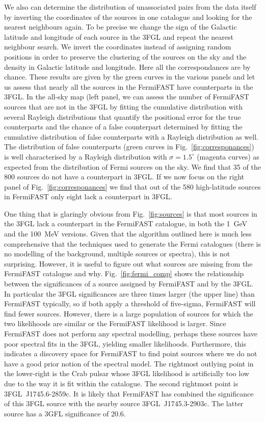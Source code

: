 \documentclass[useAMS,usenatbib]{mn2e}
\begin{document}
We also can determine the distribution of unassociated pairs from the
data itself by inverting the coordinates of the sources in one
catalogue and looking for the nearest neighbours again.  To be precise
we change the sign of the Galactic latitude and longitude of each
source in the 3FGL and repeat the nearest neighbour search.  We invert
the coordinates instead of assigning random positions in order to
preserve the clustering of the sources on the sky and the density in
Galactic latitude and longitude.  Here all the correspondances are by
chance.  These results are given by the green curves in the various
panels and let us assess that nearly all the sources in the FermiFAST
have counterparts in the 3FGL.  In the all-sky map (left panel, we can
assess the number of FermiFAST sources that are not in the 3FGL by
fitting the cumulative distribution with several Rayleigh
distributions that quantify the positional error for the true
counterparts and the chance of a false counterpart determined by
fitting the cumulative distribution of false counterparts with a
Rayleigh distribution as well.  The distribution of false counterparts
(green curves in Fig.~\ref{fig:corresponances}) is well characterised
by a Rayleigh distribution with $\sigma=1.5^\circ$ (magenta curves) as
expected from the distribution of Fermi sources on the sky. We find
that 35 of the 800 sources do not have a counterpart in 3FGL.  If we
now focus on the right panel of Fig.~\ref{fig:corresponances} we find
that out of the 580 high-latitude sources in FermiFAST only eight lack
a counterpart in 3FGL.

One thing that is glaringly obvious from Fig.~\ref{fig:sources} is
that most sources in the 3FGL lack a counterpart in the FermiFAST
catalogue, in both the 1~GeV and the 100~MeV versions.  Given that the
algorithm outlined here is much less comprehensive that the techniques
used to generate the Fermi catalogues (there is no modelling of the
background, multiple sources or spectra), this is not surprising.
However, it is useful to figure out what sources are missing from the
FermiFAST catalogue and why.  Fig.~\ref{fig:fermi_comp} shows the
relationship between the significances of a source assigned by
FermiFAST and by the 3FGL.  In particular the 3FGL significances are
three times larger (the upper line) than FermiFAST typically, so if
both apply a threshold of five-sigma, FermiFAST will find fewer
sources.  However, there is a large population of sources for which
the two likelihoods are similar or the FermiFAST likelihood is larger.
Since FermiFAST does not perform any spectral modelling, perhaps these
sources have poor spectral fits in the 3FGL, yielding smaller
likelihoods.  Furthermore, this indicates a discovery space for
FermiFAST to find point sources where we do not have a good prior
notion of the spectral model.  The rightmost outlying point in the
lower-right is the Crab pulsar whose 3FGL likelihood is artificially
too low due to the way it is fit within the catalogue.  The second
rightmost point is 3FGL~J1745.6-2859c. It is likely that FermiFAST has
combined the significance of this 3FGL source with the nearby source
3FGL~J1745.3-2903c.  The latter source has a 3GFL significance of 20.6.
\end{document}
